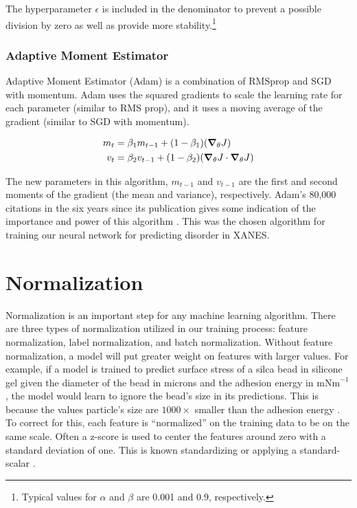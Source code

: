 \noindent The hyperparameter $ \epsilon $ is included in the denominator to prevent a possible division by zero as well as provide more stability.\footnote{Typical values for $ \alpha $  and $ \beta $  are 0.001 and 0.9, respectively.} 

\subsubsection{Adaptive Moment Estimator}
Adaptive Moment Estimator (Adam) is a combination of RMSprop and SGD with momentum. Adam uses the squared gradients to scale the learning rate for each parameter (similar to RMS prop), and it uses a moving average of the gradient (similar to SGD with momentum).

\begin{align} 
    \begin{split} 
    m_t &= \beta_1 m_{t-1} + (1 - \beta_1) (\grad_\theta J) \\ 
    v_t &= \beta_2 v_{t-1} + (1 - \beta_2) (\grad_\theta J \cdot \grad_\theta J) 
    \end{split} 
\end{align}

\noindent The new parameters in this algorithm, $ m_{t-1} $ and $ v_{t-1} $ are the first and second moments of the gradient (the mean and variance), respectively. Adam's 80,000 citations in the six years since its publication gives some indication of the importance and power of this algorithm \cite{orig-ADAM-paper}. This was the chosen algorithm for training our neural network for predicting disorder in XANES.

\section{Normalization} \label{sec:normalization}
Normalization is an important step for any machine learning algorithm. There are three types of normalization utilized in our training process: feature normalization, label normalization, and batch normalization. Without feature normalization, a model will put greater weight on features with larger values. For example, if a model is trained to predict surface stress of a silca bead in silicone gel given the diameter of the bead in microns and the adhesion energy in $ \text{mNm}^{-1} $, the model would learn to ignore the bead's size in its predictions. This is because the values particle's size are $ 1000\times $ smaller than the adhesion energy \cite{williamsThesis}. To correct for this, each feature is ``normalized'' on the training data to be on the same scale. Often a z-score is used to center the features around zero with a standard deviation of one. This is known standardizing or applying a standard-scalar \cite{statsTextbook}.

